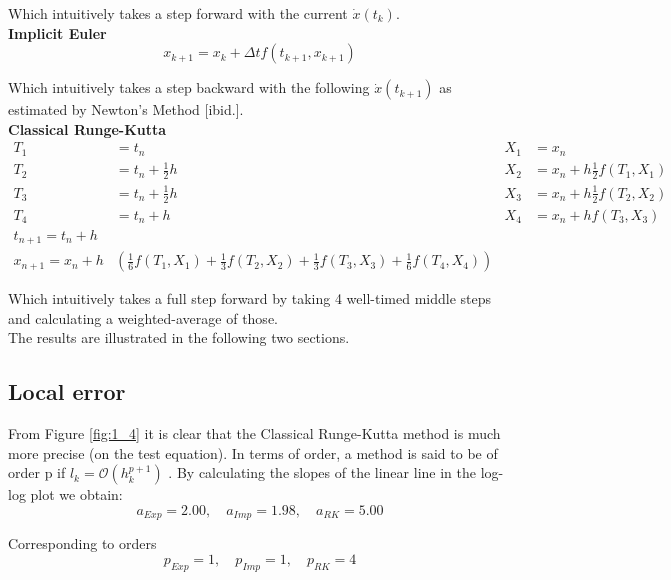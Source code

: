 Which intuitively takes a step forward with the current $\dot{x}(t_k)$.
\\
\textbf{Implicit Euler \cite{JrgensenScientificEquationsb}}
\begin{equation}
    x_{k+1}=x_{k}+\Delta t f\left(t_{k+1}, x_{k+1}\right)
\end{equation}

Which intuitively takes a step backward with the following $\dot{x}(t_{k+1})$ as estimated by Newton's Method [ibid.].
\\
\textbf{Classical Runge-Kutta \cite{JrgensenRunge-KuttaEquations}}
$$
\begin{aligned}
T_{1} &=t_{n} & X_{1} &=x_{n} \\
T_{2} &=t_{n}+\frac{1}{2} h & X_{2} &=x_{n}+h \frac{1}{2} f\left(T_{1}, X_{1}\right) \\
T_{3} &=t_{n}+\frac{1}{2} h & X_{3} &=x_{n}+h \frac{1}{2} f\left(T_{2}, X_{2}\right) \\
T_{4} &=t_{n}+h & X_{4} &=x_{n}+h f\left(T_{3}, X_{3}\right) \\
t_{n+1}=t_{n}+h & & \\
x_{n+1}=x_{n}+h &\left(\frac{1}{6} f\left(T_{1}, X_{1}\right)+\frac{1}{3} f\left(T_{2}, X_{2}\right)+\frac{1}{3} f\left(T_{3}, X_{3}\right)+\frac{1}{6} f\left(T_{4}, X_{4}\right)\right)
\end{aligned}
$$

Which intuitively takes a full step forward by taking 4 well-timed middle steps and calculating a weighted-average of those.
\\

The results are illustrated in the following two sections.






\subsection{Local error}
From Figure \ref{fig:1_4} it is clear that the Classical Runge-Kutta method is much more precise (on the test equation). In terms of order, a method is said to be of order p if $l_{k}=\mathcal{O}\left(h_{k}^{p+1}\right)$ \cite{JrgensenScientificEquationsc}. By calculating the slopes of the linear line in the log-log plot we obtain:
$$
a_{Exp} = 2.00, \quad a_{Imp} = 1.98, \quad a_{RK} = 5.00
$$

Corresponding to orders
$$
p_{Exp} = 1, \quad p_{Imp} = 1, \quad p_{RK} = 4
$$


